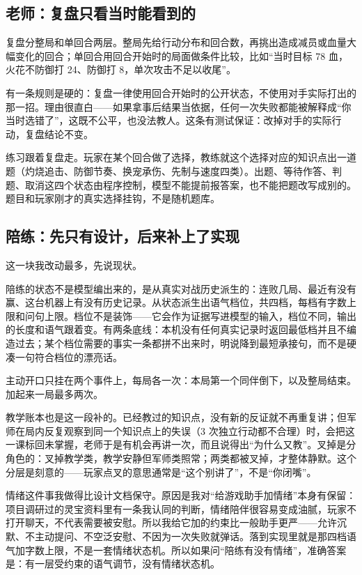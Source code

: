 \subsection{老师：复盘只看当时能看到的}

复盘分整局和单回合两层。整局先给行动分布和回合数，再挑出造成减员或血量大幅变化的回合；单回合用回合开始时的局面做条件比较，比如“当时目标 78 血，火花不防御打 24、防御打 8，单次攻击不足以收尾”。

有一条规则是硬的：复盘一律使用回合开始时的公开状态，不使用对手实际打出的那一招。理由很直白——如果拿事后结果当依据，任何一次失败都能被解释成“你当时选错了”，这既不公平，也没法教人。这条有测试保证：改掉对手的实际行动，复盘结论不变。

练习跟着复盘走。玩家在某个回合做了选择，教练就这个选择对应的知识点出一道题（灼烧追击、防御节奏、换宠承伤、先制与速度四类）。出题、等待作答、判题、取消这四个状态由程序控制，模型不能提前报答案，也不能把题改写成别的。题目和玩家刚才的真实选择挂钩，不是随机题库。

\subsection{陪练：先只有设计，后来补上了实现}

这一块我改动最多，先说现状。

陪练的状态不是模型编出来的，是从真实对战历史派生的：连败几局、最近有没有赢、这台机器上有没有历史记录。从状态派生出语气档位，共四档，每档有字数上限和问句上限。档位不是装饰——它会作为证据写进模型的输入，档位不同，输出的长度和语气跟着变。有两条底线：本机没有任何真实记录时返回最低档并且不编造过去；某个档位需要的事实一条都拼不出来时，明说降到最短承接句，而不是硬凑一句符合档位的漂亮话。

主动开口只挂在两个事件上，每局各一次：本局第一个同伴倒下，以及整局结束。加起来一局最多两次。

教学账本也是这一段补的。已经教过的知识点，没有新的反证就不再重复讲；但军师在局内反复观察到同一个知识点上的失误（3 次独立行动都不合理）时，会把这一课标回未掌握，老师于是有机会再讲一次，而且说得出“为什么又教”。叉掉是分角色的：叉掉教学类，教学安静但军师类照常；两类都被叉掉，才整体静默。这个分层是刻意的——玩家点叉的意思通常是“这个别讲了”，不是“你闭嘴”。

情绪这件事我做得比设计文档保守。原因是我对“给游戏助手加情绪”本身有保留：项目调研过的灵宝资料里有一条我认同的判断，情绪陪伴很容易变成油腻，玩家不打开聊天，不代表需要被安慰。所以我给它加的约束比一般助手更严——允许沉默、不主动提问、不空泛安慰、不因为一次失败就弹话。落到实现里就是那四档语气加字数上限，不是一套情绪状态机。所以如果问“陪练有没有情绪”，准确答案是：有一层受约束的语气调节，没有情绪状态机。
